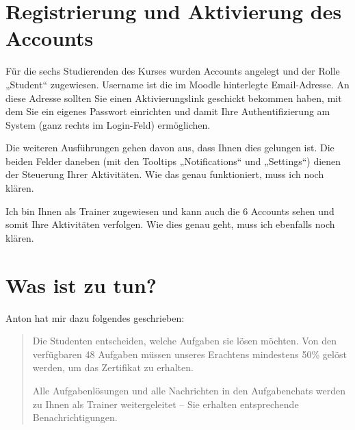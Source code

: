 \documentclass[11pt,a4paper]{article}
\begin{document}
\section{Registrierung und Aktivierung des Accounts}

Für die sechs Studierenden des Kurses wurden Accounts angelegt und der Rolle
„Student“ zugewiesen. Username ist die im Moodle hinterlegte Email-Adresse.
An diese Adresse sollten Sie einen Aktivierungslink geschickt bekommen haben,
mit dem Sie ein eigenes Passwort einrichten und damit Ihre Authentifizierung
am System (ganz rechts im Login-Feld) ermöglichen.  

Die weiteren Ausführungen gehen davon aus, dass Ihnen dies gelungen ist.  Die
beiden Felder daneben (mit den Tooltips „Notifications“ und „Settings“) dienen
der Steuerung Ihrer Aktivitäten. Wie das genau funktioniert, muss ich noch
klären.

Ich bin Ihnen als Trainer zugewiesen und kann auch die 6 Accounts sehen und
somit Ihre Aktivitäten verfolgen. Wie dies genau geht, muss ich ebenfalls noch
klären. 

\section{Was ist zu tun?}

Anton hat mir dazu folgendes geschrieben:
\begin{quote}
  Die Studenten entscheiden, welche Aufgaben sie lösen möchten. Von den
  verfüg\-baren 48 Aufgaben müssen unseres Erachtens mindestens 50\% gelöst
  werden, um das Zertifikat zu erhalten.
  
  Alle Aufgabenlösungen und alle Nachrichten in den Aufgabenchats werden zu
  Ihnen als Trainer weitergeleitet -- Sie erhalten entsprechende
  Benachrichtigungen.
\end{quote}
\end{document}
